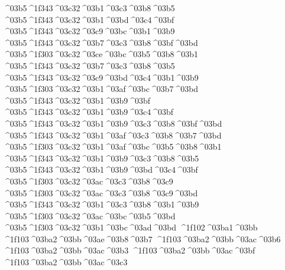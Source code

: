 {	^^^^03b5^^^^1f343^^^^03c32^^^^03b1^^^^03c3^^^^03b8^^^^03b5
	^^^^03b5^^^^1f343^^^^03c32^^^^03b1^^^^03bd^^^^03c4^^^^03bf
%
	^^^^03b5^^^^1f343^^^^03c32^^^^03c9^^^^03bc^^^^03b1^^^^03b9
	^^^^03b5^^^^1f343^^^^03c32^^^^03b7^^^^03c3^^^^03b8^^^^03bf^^^^03bd
	^^^^03b5^^^^1f303^^^^03c32^^^^03ce^^^^03bc^^^^03b5^^^^03b8^^^^03b1
	^^^^03b5^^^^1f343^^^^03c32^^^^03b7^^^^03c3^^^^03b8^^^^03b5
	^^^^03b5^^^^1f343^^^^03c32^^^^03c9^^^^03bd^^^^03c4^^^^03b1^^^^03b9
%
	^^^^03b5^^^^1f303^^^^03c32^^^^03b1^^^^03af^^^^03bc^^^^03b7^^^^03bd
	^^^^03b5^^^^1f343^^^^03c32^^^^03b1^^^^03b9^^^^03bf
	^^^^03b5^^^^1f343^^^^03c32^^^^03b1^^^^03b9^^^^03c4^^^^03bf
	^^^^03b5^^^^1f343^^^^03c32^^^^03b1^^^^03b9^^^^03c3^^^^03b8^^^^03bf^^^^03bd
	^^^^03b5^^^^1f343^^^^03c32^^^^03b1^^^^03af^^^^03c3^^^^03b8^^^^03b7^^^^03bd
	^^^^03b5^^^^1f303^^^^03c32^^^^03b1^^^^03af^^^^03bc^^^^03b5^^^^03b8^^^^03b1
	^^^^03b5^^^^1f343^^^^03c32^^^^03b1^^^^03b9^^^^03c3^^^^03b8^^^^03b5
	^^^^03b5^^^^1f343^^^^03c32^^^^03b1^^^^03b9^^^^03bd^^^^03c4^^^^03bf
%
	^^^^03b5^^^^1f303^^^^03c32^^^^03ac^^^^03c3^^^^03b8^^^^03c9
	^^^^03b5^^^^1f303^^^^03c32^^^^03ac^^^^03c3^^^^03b8^^^^03c9^^^^03bd
%
	^^^^03b5^^^^1f343^^^^03c32^^^^03b1^^^^03c3^^^^03b8^^^^03b1^^^^03b9
	^^^^03b5^^^^1f303^^^^03c32^^^^03ac^^^^03bc^^^^03b5^^^^03bd		%
	^^^^03b5^^^^1f303^^^^03c32^^^^03b1^^^^03bc^^^^03ad^^^^03bd
%	
^^^^1f102^^^^03ba1^^^^03bb 			%
	^^^^1f103^^^^03ba2^^^^03bb^^^^03ae^^^^03b8^^^^03b7  		%
	^^^^1f103^^^^03ba2^^^^03bb^^^^03ac^^^^03b6   		%
	^^^^1f103^^^^03ba2^^^^03bb^^^^03ac^^^^03b3  		%
	^^^^1f103^^^^03ba2^^^^03bb^^^^03ac^^^^03bf		%
	^^^^1f103^^^^03ba2^^^^03bb^^^^03ac^^^^03c3		%
}
